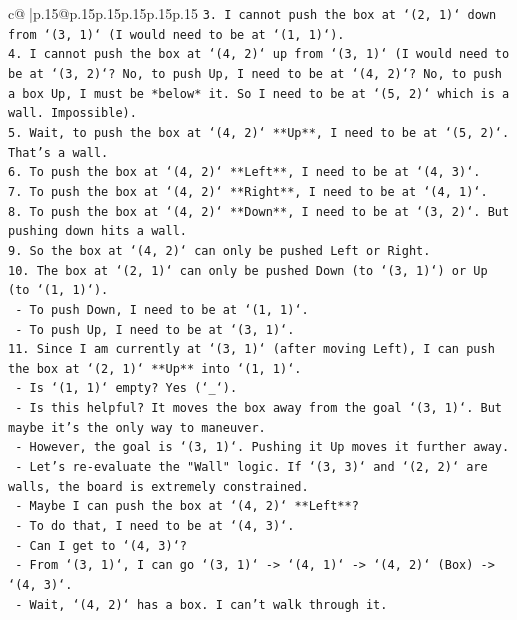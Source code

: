 \documentclass{article}
\begin{document}
{\begin{supertabular}{c@{$\;$}|p{.15\linewidth}@{}p{.15\linewidth}p{.15\linewidth}p{.15\linewidth}p{.15\linewidth}p{.15\linewidth}}
{{{\texttt{3.  I cannot push the box at `(2, 1)` down from `(3, 1)` (I would need to be at `(1, 1)`).} \\
\texttt{4.  I cannot push the box at `(4, 2)` up from `(3, 1)` (I would need to be at `(3, 2)`? No, to push Up, I need to be at `(4, 2)`? No, to push a box Up, I must be *below* it. So I need to be at `(5, 2)` which is a wall. Impossible).} \\
\texttt{5.  Wait, to push the box at `(4, 2)` **Up**, I need to be at `(5, 2)`. That's a wall.} \\
\texttt{6.  To push the box at `(4, 2)` **Left**, I need to be at `(4, 3)`.} \\
\texttt{7.  To push the box at `(4, 2)` **Right**, I need to be at `(4, 1)`.} \\
\texttt{8.  To push the box at `(4, 2)` **Down**, I need to be at `(3, 2)`. But pushing down hits a wall.} \\
\texttt{9.  So the box at `(4, 2)` can only be pushed Left or Right.} \\
\texttt{10. The box at `(2, 1)` can only be pushed Down (to `(3, 1)`) or Up (to `(1, 1)`).} \\
\texttt{    {-}   To push Down, I need to be at `(1, 1)`.} \\
\texttt{    {-}   To push Up, I need to be at `(3, 1)`.} \\
\texttt{11. Since I am currently at `(3, 1)` (after moving Left), I can push the box at `(2, 1)` **Up** into `(1, 1)`.} \\
\texttt{    {-}   Is `(1, 1)` empty? Yes (`\_`).} \\
\texttt{    {-}   Is this helpful? It moves the box away from the goal `(3, 1)`. But maybe it's the only way to maneuver.} \\
\texttt{    {-}   However, the goal is `(3, 1)`. Pushing it Up moves it further away.} \\
\texttt{    {-}   Let's re{-}evaluate the "Wall" logic. If `(3, 3)` and `(2, 2)` are walls, the board is extremely constrained.} \\
\texttt{    {-}   Maybe I can push the box at `(4, 2)` **Left**?} \\
\texttt{        {-}   To do that, I need to be at `(4, 3)`.} \\
\texttt{        {-}   Can I get to `(4, 3)`?} \\
\texttt{        {-}   From `(3, 1)`, I can go `(3, 1)` {-}> `(4, 1)` {-}> `(4, 2)` (Box) {-}> `(4, 3)`.} \\
\texttt{        {-}   Wait, `(4, 2)` has a box. I can't walk through it.} \\
}}}
\end{supertabular}}
\end{document}
